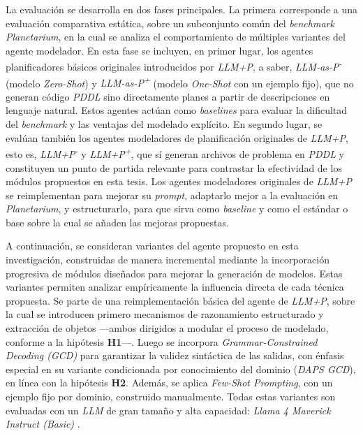 La evaluación se desarrolla en dos fases principales. La primera corresponde a una evaluación comparativa estática, sobre un subconjunto común del \textit{benchmark Planetarium}, en la cual se analiza el comportamiento de múltiples variantes del agente modelador. En esta fase se incluyen, en primer lugar, los agentes planificadores básicos originales introducidos por \textit{LLM+P}, a saber, \textit{LLM-as-P\textsuperscript{-}} (modelo \textit{Zero-Shot}) y \textit{LLM-as-P\textsuperscript{+}} (modelo \textit{One-Shot} con un ejemplo fijo), que no generan código \textit{PDDL} sino directamente planes a partir de descripciones en lenguaje natural. Estos agentes actúan como \textit{baselines} para evaluar la dificultad del \textit{benchmark} y las ventajas del modelado explícito. En segundo lugar, se evalúan también los agentes modeladores de planificación originales de \textit{LLM+P}, esto es, \textit{LLM+P\textsuperscript{-}} y \textit{LLM+P\textsuperscript{+}}, que sí generan archivos de problema en \textit{PDDL} y constituyen un punto de partida relevante para contrastar la efectividad de los módulos propuestos en esta tesis. Los agentes modeladores originales de \textit{LLM+P} se reimplementan para mejorar su \textit{prompt}, adaptarlo mejor a la evaluación en \textit{Planetarium}, y estructurarlo, para que sirva como \textit{baseline} y como el estándar o base sobre la cual se añaden las mejoras propuestas.

A continuación, se consideran variantes del agente propuesto en esta investigación, construidas de manera incremental mediante la incorporación progresiva de módulos diseñados para mejorar la generación de modelos. Estas variantes permiten analizar empíricamente la influencia directa de cada técnica propuesta. Se parte de una reimplementación básica del agente de \textit{LLM+P}, sobre la cual se introducen primero mecanismos de razonamiento estructurado y extracción de objetos —ambos dirigidos a modular el proceso de modelado, conforme a la hipótesis \textbf{H1}—. Luego se incorpora \textit{Grammar-Constrained Decoding (GCD)} para garantizar la validez sintáctica de las salidas, con énfasis especial en su variante condicionada por conocimiento del dominio (\textit{DAPS GCD}), en línea con la hipótesis \textbf{H2}. Además, se aplica \textit{Few-Shot Prompting}, con un ejemplo fijo por dominio, construido manualmente. Todas estas variantes son evaluadas con un \textit{LLM} de gran tamaño y alta capacidad: \textit{Llama 4 Maverick Instruct (Basic)} \parencite{fireworks2025llama4maverick}. 

